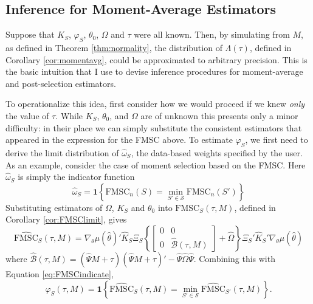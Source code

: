 \subsection{Inference for Moment-Average Estimators}
Suppose that $K_S$, $\varphi_S$, $\theta_0$, $\Omega$ and $\tau$ were all known. 
Then, by simulating from $M$, as defined in Theorem \ref{thm:normality}, the distribution of $\Lambda(\tau)$, defined in Corollary \ref{cor:momentavg}, could be approximated to arbitrary precision. 
This is the basic intuition that I use to devise inference procedures for moment-average and post-selection estimators.

To operationalize this idea, first consider how we would proceed if we knew \emph{only} the value of $\tau$.  
While $K_S$, $\theta_0$, and $\Omega$ are of unknown this presents only a minor difficulty: in their place we can simply substitute the consistent estimators that appeared in the expression for the FMSC above.
To estimate $\varphi_S$, we first need to derive the limit distribution of $\widehat{\omega}_S$, the data-based weights specified by the user. 
As an example, consider the case of moment selection based on the FMSC. Here $\widehat{\omega}_S$ is simply the indicator function
\begin{equation}
	\label{eq:FMSCindicate}
	\widehat{\omega}_S = \mathbf{1}\left\{\mbox{FMSC}_n(S) = \min_{S'\in \mathscr{S}} \mbox{FMSC}_n(S')\right\}
\end{equation}
Substituting estimators of $\Omega$, $K_S$ and $\theta_0$ into $\mbox{FMSC}_S(\tau,M)$, defined in Corollary \ref{cor:FMSClimit}, gives
\begin{equation*}
	\widehat{\mbox{FMSC}}_S(\tau,M) = \nabla_\theta\mu(\widehat{\theta})'\widehat{K}_S\Xi_S \left\{\left[\begin{array}{cc}0&0\\0&\widehat{\mathcal{B}}(\tau,M) \end{array}\right] + \widehat{\Omega}\right\}\Xi_S'\widehat{K}_S'\nabla_\theta\mu(\widehat{\theta})
\end{equation*}
where $\widehat{\mathcal{B}}(\tau,M) = (\widehat{\Psi} M + \tau)(\widehat{\Psi} M + \tau)' - \widehat{\Psi} \widehat{\Omega} \widehat{\Psi}$.
Combining this with Equation \ref{eq:FMSCindicate},
\begin{equation*}
	\widehat{\varphi}_S(\tau,M) = \mathbf{1}\left\{\widehat{\mbox{FMSC}}_S(\tau,M) = \min_{S'\in \mathscr{S}} \widehat{\mbox{FMSC}}_{S'}(\tau,M)\right\}.
\end{equation*}
